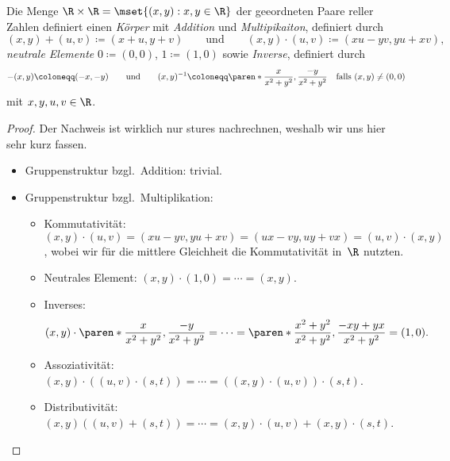 \documentclass[a4paper]{article}
\begin{document}
\begin{theorem}\label{thm:complexnumbers}
    Die Menge $\R\times\R = \mset{(x,y) : x,y \in \R}$ der geeordneten Paare reller Zahlen definiert einen \emph{Körper} mit \emph{Addition} und \emph{Multipikaiton}, definiert durch
    \begin{equation*}
        (x,y) + (u,v) \coloneqq (x+u,y+v) \qquad\text{und}\qquad (x,y) \cdot (u,v) \coloneqq (xu-yv,yu+xv),
    \end{equation*}
    \emph{neutrale Elemente} $0 \coloneqq (0, 0)$, $1 \coloneqq (1, 0)$ sowie \emph{Inverse}, definiert durch
    \begin{equation*}
        -(x,y) \coloneqq (-x,-y) \qquad\text{und}\qquad (x,y)^{-1} \coloneqq \paren*{\frac{x}{x^2+y^2},\frac{-y}{x^2+y^2}} \quad\text{falls } (x,y) \neq (0, 0)
    \end{equation*}
    mit $x,y,u,v \in \R$.
\end{theorem}

\begin{proof}
    Der Nachweis ist wirklich nur stures nachrechnen, weshalb wir uns hier sehr kurz fassen.
    \begin{itemize}
        \item Gruppenstruktur bzgl.\ Addition: trivial.
        \item Gruppenstruktur bzgl.\ Multiplikation:
              \begin{itemize}
                  \item Kommutativität: $(x,y) \cdot (u,v) = (xu-yv,yu+xv) = (ux-vy,uy+vx) = (u,v) \cdot (x,y)$, wobei wir für die mittlere Gleichheit die Kommutativität in~$\R$ nutzten.
                  \item Neutrales Element: $(x,y) \cdot (1, 0) = \cdots = (x,y)$.
                  \item Inverses:
                        \begin{equation*}
                            (x,y) \cdot \paren*{\frac{x}{x^2+y^2},\frac{-y}{x^2+y^2}} = \cdots = \paren*{\frac{x^2+y^2}{x^2+y^2},\frac{-xy+yx}{x^2+y^2}} = (1, 0).
                        \end{equation*}
                  \item Assoziativität: $(x,y) \cdot ((u,v) \cdot (s,t)) = \cdots = ((x,y) \cdot (u,v)) \cdot (s,t)$.
                  \item Distributivität: $(x,y) ((u,v) + (s,t)) = \cdots = (x,y)\cdot(u,v) + (x,y)\cdot(s,t)$.\qedhere
              \end{itemize}
    \end{itemize}
\end{proof}
\end{document}
